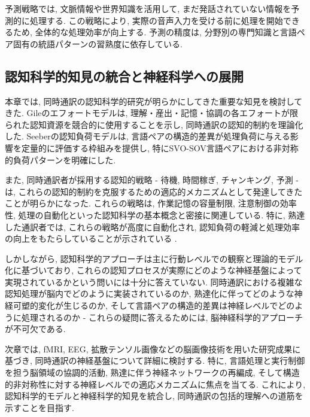 予測戦略では, 文脈情報や世界知識を活用して, まだ発話されていない情報を予測的に処理する.
この戦略により, 実際の音声入力を受ける前に処理を開始できるため, 全体的な処理効率が向上する.
予測の精度は, 分野別の専門知識と言語ペア固有の統語パターンの習熟度に依存している.

\subsection{認知科学的知見の統合と神経科学への展開}

本章では, 同時通訳の認知科学的研究が明らかにしてきた重要な知見を検討してきた.
Gileのエフォートモデルは, 理解・産出・記憶・協調の各エフォートが限られた認知資源を競合的に使用することを示し, 同時通訳の認知的制約を理論化した.
Seeberの認知負荷モデルは, 言語ペアの構造的差異が処理負荷に与える影響を定量的に評価する枠組みを提供し, 特にSVO-SOV言語ペアにおける非対称的負荷パターンを明確にした.

また, 同時通訳者が採用する認知的戦略 - 待機, 時間稼ぎ, チャンキング, 予測 - は, これらの認知的制約を克服するための適応的メカニズムとして発達してきたことが明らかになった.
これらの戦略は, 作業記憶の容量制限, 注意制御の効率性, 処理の自動化といった認知科学の基本概念と密接に関連している.
特に, 熟達した通訳者では, これらの戦略が高度に自動化され, 認知負荷の軽減と処理効率の向上をもたらしていることが示されている \cite{christoffels2006cognitive}.

しかしながら, 認知科学的アプローチは主に行動レベルでの観察と理論的モデル化に基づいており, これらの認知プロセスが実際にどのような神経基盤によって実現されているかという問いには十分に答えていない.
同時通訳における複雑な認知処理が脳内でどのように実装されているのか, 熟達化に伴ってどのような神経可塑的変化が生じるのか, そして言語ペアの構造的差異は神経レベルでどのように処理されるのか - これらの疑問に答えるためには, 脳神経科学的アプローチが不可欠である.

次章では, fMRI, EEG, 拡散テンソル画像などの脳画像技術を用いた研究成果に基づき, 同時通訳の神経基盤について詳細に検討する.
特に, 言語処理と実行制御を担う脳領域の協調的活動, 熟達に伴う神経ネットワークの再編成, そして構造的非対称性に対する神経レベルでの適応メカニズムに焦点を当てる.
これにより, 認知科学的モデルと神経科学的知見を統合し, 同時通訳の包括的理解への道筋を示すことを目指す.